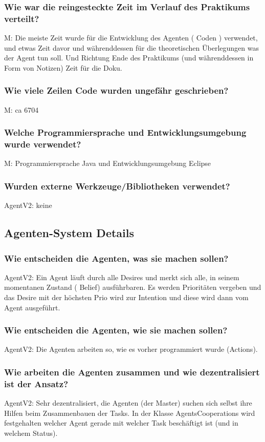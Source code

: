 \documentclass[runningheads]{llncs}
\begin{document}
\subsubsection{Wie war die reingesteckte Zeit im Verlauf des Praktikums verteilt?\\}
M: Die meiste Zeit wurde für die Entwicklung des Agenten ( Coden ) verwendet, und etwas Zeit davor und währenddessen für die theoretischen Überlegungen was der Agent tun soll. Und Richtung Ende des Praktikums (und währenddessen in Form von Notizen) Zeit für die Doku. 
\subsubsection{Wie viele Zeilen Code wurden ungefähr geschrieben?\\}
M: ca 6704
\subsubsection{Welche Programmiersprache und Entwicklungsumgebung wurde verwendet?\\}
M: Programmiersprache Java und Entwicklungsumgebung Eclipse
\subsubsection{Wurden externe Werkzeuge/Bibliotheken verwendet?\\}
AgentV2: keine
\subsection{Agenten-System Details}
\subsubsection{Wie entscheiden die Agenten, was sie machen sollen?\\}
AgentV2: Ein Agent läuft durch alle Desires und merkt sich alle, in seinem momentanen Zustand ( Belief) ausführbaren. Es werden Prioritäten vergeben und das Desire mit der höchsten Prio wird zur Intention und diese wird dann vom Agent ausgeführt.
\subsubsection{Wie entscheiden die Agenten, wie sie machen sollen?\\}
AgentV2: Die Agenten arbeiten so, wie es vorher programmiert wurde (Actions). 
\subsubsection{Wie arbeiten die Agenten zusammen und wie dezentralisiert ist der Ansatz?\\}
AgentV2: Sehr dezentralisiert, die Agenten (der Master) suchen sich selbst ihre Hilfen beim Zusammenbauen der Tasks. In der Klasse AgentsCooperations wird festgehalten welcher Agent gerade mit welcher Task beschäftigt ist (und in welchem Status).
\end{document}
